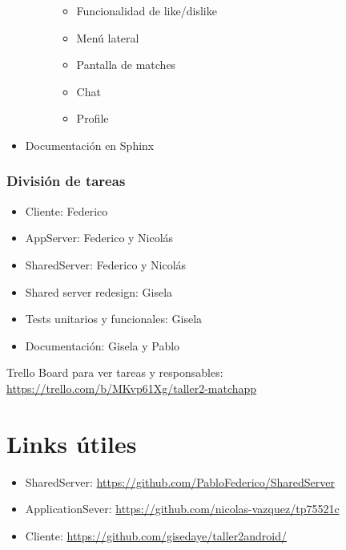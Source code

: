 \documentclass[letterpaper,10pt,english]{sphinxmanual}
\begin{document}
\begin{itemize}
\begin{description}
\begin{itemize}
\item {} 
Funcionalidad de like/dislike

\item {} 
Menú lateral

\item {} 
Pantalla de matches

\item {} 
Chat

\item {} 
Profile

\end{itemize}

\end{description}

\item {} 
Documentación en Sphinx

\end{itemize}


\subsubsection{División de tareas}
\label{manuals:id7}\begin{itemize}
\item {} 
Cliente: Federico

\item {} 
AppServer:  Federico y Nicolás

\item {} 
SharedServer: Federico y Nicolás

\item {} 
Shared server redesign: Gisela

\item {} 
Tests unitarios y funcionales: Gisela

\item {} 
Documentación: Gisela y Pablo

\end{itemize}

Trello Board para ver tareas y responsables:
\href{https://trello.com/b/MKvp61Xg/taller2-matchapp}{https://trello.com/b/MKvp61Xg/taller2-matchapp}


\section{Links útiles}
\label{manuals:id8}\begin{itemize}
\item {} 
SharedServer: \href{https://github.com/PabloFederico/SharedServer}{https://github.com/PabloFederico/SharedServer}

\item {} 
ApplicationSever: \href{https://github.com/nicolas-vazquez/tp75521c}{https://github.com/nicolas-vazquez/tp75521c}

\item {} 
Cliente: \href{https://github.com/gisedaye/taller2android/}{https://github.com/gisedaye/taller2android/}

\end{itemize}
\end{document}
